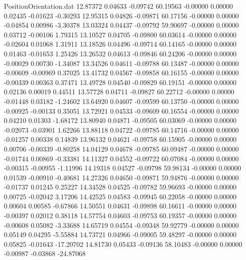 \begin{filecontents}{PositionOrientation.dat}
  12.87372    0.04633   -0.09742    60.19563   -0.00000    0.00000    0.02435   -0.01623   -0.30293
  12.95315    0.04826   -0.09871    60.17156   -0.00000    0.00000   -0.04854    0.00986   -3.30378
  13.03324    0.04437   -0.09792    59.90697   -0.00000    0.00000    0.03712   -0.00106    1.79315
  13.10527    0.04705   -0.09800    60.03614   -0.00000    0.00000   -0.02604    0.01068    1.31911
  13.18526    0.04496   -0.09714    60.14165   -0.00000    0.00000    0.01463   -0.01653    1.25426
  13.26532    0.04613   -0.09846    60.24206   -0.00000    0.00000   -0.00029    0.00730   -1.34087
  13.34526    0.04611   -0.09788    60.13487   -0.00000    0.00000   -0.00609   -0.00969    0.37025
  13.41732    0.04567   -0.09858    60.16155   -0.00000    0.00000   -0.00339    0.00363    0.37471
  13.49728    0.04540   -0.09829    60.19151   -0.00000    0.00000    0.02136    0.00019    0.44511
  13.57728    0.04711   -0.09827    60.22712   -0.00000    0.00000   -0.01448    0.03182   -1.24602
  13.64920    0.04607   -0.09599    60.13750   -0.00000    0.00000   -0.00925   -0.00133    0.35051
  13.72921    0.04533   -0.09609    60.16554   -0.00000    0.00000    0.04210    0.01303   -1.68172
  13.80940    0.04871   -0.09505    60.03069   -0.00000    0.00000   -0.02073   -0.03901    1.62266
  13.88118    0.04722   -0.09785    60.14716   -0.00000    0.00000   -0.01257    0.00338    0.14839
  13.96132    0.04621   -0.09758    60.15905   -0.00000    0.00000    0.00706   -0.00339   -0.80258
  14.04129    0.04678   -0.09785    60.09487   -0.00000    0.00000   -0.01744    0.00869   -0.33381
  14.11327    0.04552   -0.09722    60.07084   -0.00000    0.00000   -0.00315   -0.00955   -1.11996
  14.19318    0.04527   -0.09798    59.98134   -0.00000    0.00000    0.01539   -0.00910   -0.40681
  14.27326    0.04650   -0.09871    59.94876   -0.00000    0.00000   -0.01737    0.01245    0.25227
  14.34528    0.04525   -0.09782    59.96693   -0.00000    0.00000    0.00725   -0.02042    3.17206
  14.42525    0.04583   -0.09945    60.22058   -0.00000    0.00000    0.00604    0.00585   -0.67866
  14.50551    0.04631   -0.09898    60.16611   -0.00000    0.00000   -0.00397    0.02012    0.38118
  14.57754    0.04603   -0.09753    60.19357   -0.00000    0.00000   -0.00608    0.05082   -3.33688
  14.65719    0.04554   -0.09348    59.92779   -0.00000    0.00000    0.05149    0.04295   -5.55884
  14.73721    0.04966   -0.09005    59.48297   -0.00000    0.00000    0.05825   -0.01643  -17.20702
  14.81730    0.05433   -0.09136    58.10483   -0.00000    0.00000   -0.00987   -0.03868  -24.87068

\end{filecontents}
